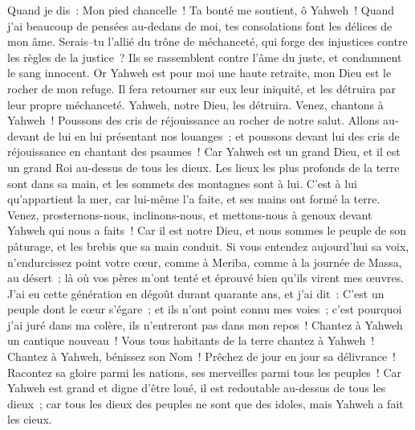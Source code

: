 \begin{multicols}{2}
Quand je dis~: Mon pied chancelle~! Ta bonté me soutient, ô Yahweh~!
Quand j'ai beaucoup de pensées au-dedans de moi, tes consolations font les délices de mon âme.
Serais–tu l'allié du trône de méchanceté, qui forge des injustices contre les règles de la justice~?
Ils se rassemblent contre l'âme du juste, et condamnent le sang innocent.
Or Yahweh est pour moi une haute retraite, mon Dieu est le rocher de mon refuge.
Il fera retourner sur eux leur iniquité, et les détruira par leur propre méchanceté. Yahweh, notre Dieu, les détruira.
\VerseOne{}Venez, chantons à Yahweh~! Poussons des cris de réjouissance au rocher de notre salut.
Allons au-devant de lui en lui présentant nos louanges~; et poussons devant lui des cris de réjouissance en chantant des psaumes~!
Car Yahweh est un grand Dieu, et il est un grand Roi au-dessus de tous les dieux.
Les lieux les plus profonds de la terre sont dans sa main, et les sommets des montagnes sont à lui.
C'est à lui qu'appartient la mer, car lui-même l'a faite, et ses mains ont formé la terre.
Venez, prosternons-nous, inclinons-nous, et mettons-nous à genoux devant Yahweh qui nous a faits~!
Car il est notre Dieu, et nous sommes le peuple de son pâturage, et les brebis que sa main conduit. Si vous entendez aujourd'hui sa voix,
n'endurcissez point votre cœur, comme à Meriba, comme à la journée de Massa, au désert~;
là où vos pères m'ont tenté et éprouvé bien qu'ils virent mes œuvres.
J'ai eu cette génération en dégoût durant quarante ans, et j'ai dit~: C'est un peuple dont le cœur s'égare~; et ils n'ont point connu mes voies~;
c'est pourquoi j'ai juré dans ma colère, ils n'entreront pas dans mon repos~!
\VerseOne{}Chantez à Yahweh un cantique nouveau~! Vous tous habitants de la terre chantez à Yahweh~!
Chantez à Yahweh, bénissez son Nom~! Prêchez de jour en jour sa délivrance~!
Racontez sa gloire parmi les nations, ses merveilles parmi tous les peuples~!
Car Yahweh est grand et digne d'être loué, il est redoutable au-dessus de tous les dieux~;
car tous les dieux des peuples ne sont que des idoles, mais Yahweh a fait les cieux.

\end{multicols}
